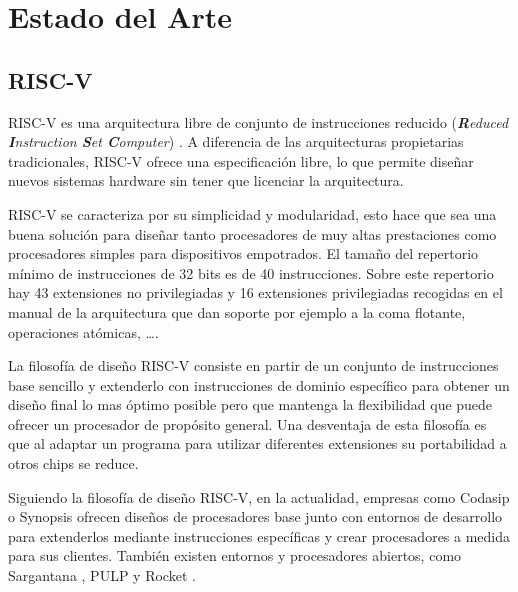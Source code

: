 \chapter{Estado del Arte}

\section{RISC-V}

RISC-V es una arquitectura libre de conjunto de instrucciones reducido (\textit{\textbf{R}educed \textbf{I}nstruction \textbf{S}et \textbf{C}omputer}) \cite{ricv_org}. A diferencia de las arquitecturas propietarias tradicionales, RISC-V ofrece una especificación libre, lo que permite diseñar nuevos sistemas hardware sin tener que licenciar la arquitectura.


RISC-V se caracteriza por su simplicidad y modularidad, esto hace que sea una buena solución para diseñar tanto procesadores de muy altas prestaciones como procesadores simples para dispositivos empotrados. El tamaño del repertorio mínimo de instrucciones de 32 bits es de 40 instrucciones. Sobre este repertorio  hay 43 extensiones no privilegiadas y 16 extensiones privilegiadas recogidas en el manual de la arquitectura que dan soporte por ejemplo a la coma flotante, operaciones atómicas, \ldots \cite{riscv_scpec_unpriv, riscv_scpec_priv}.

La filosofía de diseño RISC-V consiste en partir de un conjunto de instrucciones base sencillo y extenderlo con instrucciones de dominio específico para obtener un diseño final lo mas óptimo posible pero que mantenga la flexibilidad que puede ofrecer un procesador de propósito general. Una desventaja de esta filosofía es que al adaptar un programa para utilizar diferentes extensiones su portabilidad a otros chips se reduce.

Siguiendo la filosofía de diseño RISC-V, en la actualidad, empresas como Codasip \cite{codasip} o Synopsis \cite{synopsis} ofrecen diseños de procesadores base junto con entornos de desarrollo para extenderlos mediante instrucciones específicas y crear procesadores a medida para sus clientes. También existen entornos y procesadores abiertos, como Sargantana \cite{riscv_sargantana}, PULP \cite{riscv_pulp} y Rocket \cite{riscv_rocket}.

